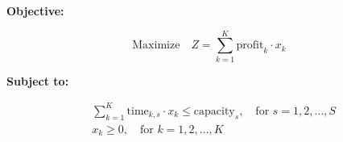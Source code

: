 \documentclass{article}
\begin{document}
\textbf{Objective:}

\[
\text{Maximize} \quad Z = \sum_{k=1}^{K} \text{profit}_k \cdot x_k
\]

\textbf{Subject to:}

\begin{align*}
& \sum_{k=1}^{K} \text{time}_{k,s} \cdot x_k \leq \text{capacity}_s, \quad \text{for } s = 1, 2, \ldots, S \\
& x_k \geq 0, \quad \text{for } k = 1, 2, \ldots, K
\end{align*}
\end{document}
